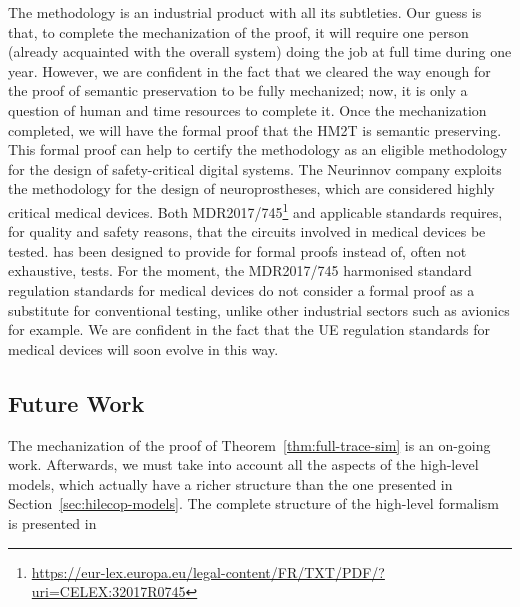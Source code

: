 \documentclass[pdflatex,sn-mathphys]{sn-jnl}%
\theoremstyle{thmstyleone}%
\theoremstyle{thmstyletwo}%
\theoremstyle{thmstylethree}%
\begin{document}
The \hilecop{} methodology is an industrial product with all its
subtleties. Our guess is that, to complete the mechanization of the
proof, it will require one person (already acquainted with the overall
system) doing the job at full time during one year.  However, we are
confident in the fact that we cleared the way enough for the proof of
semantic preservation to be fully mechanized; now, it is only a
question of human and time resources to complete it.  Once the
mechanization completed, we will have the formal proof that the HM2T
is semantic preserving. This formal proof can help to certify the
\hilecop{} methodology as an eligible methodology for the design of
safety-critical digital systems.  The Neurinnov company exploits the
\hilecop{} methodology for the design of neuroprostheses, which are
considered highly critical medical devices. %
Both
MDR2017/745\footnote{\url{https://eur-lex.europa.eu/legal-content/FR/TXT/PDF/?uri=CELEX:32017R0745}}
and applicable standards requires, for quality and safety reasons,
that the circuits involved in medical devices be tested. \hilecop{}
has been designed to provide for formal proofs instead of, often not
exhaustive, tests.  For the moment, the MDR2017/745 harmonised
standard regulation standards for medical devices do not consider a
formal proof as a substitute for conventional testing, unlike other
industrial sectors such as avionics for example. We are confident in
the fact that the UE regulation standards for medical devices will
soon evolve in this way.


\subsection{Future Work}
\label{sec:future}

The mechanization of the proof of Theorem~\ref{thm:full-trace-sim} is
an on-going work.  Afterwards, we must take into account all the
aspects of the \hilecop{} high-level models, which actually have a
richer structure than the one presented in
Section~\ref{sec:hilecop-models}. The complete structure of the
high-level formalism is presented in 

\end{document}
